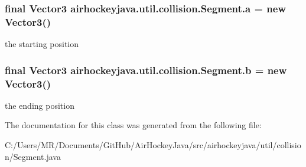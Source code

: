 \subsubsection[{a}]{\setlength{\rightskip}{0pt plus 5cm}final {\bf Vector3} airhockeyjava.\+util.\+collision.\+Segment.\+a = new {\bf Vector3}()}\label{classairhockeyjava_1_1util_1_1collision_1_1_segment_a3e5f76be3d478317b7fa3945b2c49538}
the starting position \hypertarget{classairhockeyjava_1_1util_1_1collision_1_1_segment_a7fb75d6e83dfcdaeb47cba048255addc}{}
\subsubsection[{b}]{\setlength{\rightskip}{0pt plus 5cm}final {\bf Vector3} airhockeyjava.\+util.\+collision.\+Segment.\+b = new {\bf Vector3}()}\label{classairhockeyjava_1_1util_1_1collision_1_1_segment_a7fb75d6e83dfcdaeb47cba048255addc}
the ending position 

The documentation for this class was generated from the following file\+:\begin{DoxyCompactItemize}
\item 
C\+:/\+Users/\+M\+R/\+Documents/\+Git\+Hub/\+Air\+Hockey\+Java/src/airhockeyjava/util/collision/Segment.\+java\end{DoxyCompactItemize}
